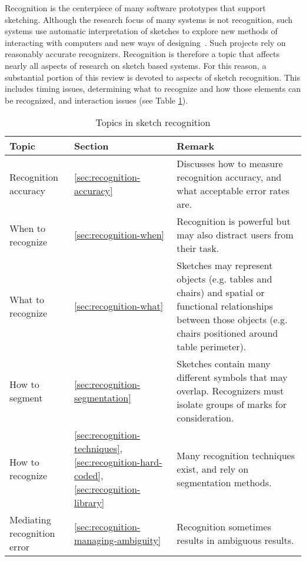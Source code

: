Recognition is the centerpiece of many software prototypes that
support sketching. Although the research focus of many systems is not
recognition, such systems use automatic interpretation of sketches to
explore new methods of interacting with computers and new ways of
designing~\cite{gross-boe,grundy-maramasketch,lin-denim}. Such
projects rely on reasonably accurate recognizers. Recognition is
therefore a topic that affects nearly all aspects of research on
sketch based systems. For this reason, a substantial portion of this
review is devoted to aspects of sketch recognition. This includes
timing issues, determining what to recognize and how those elements
can be recognized, and interaction issues (see
Table \ref{tab:recognition-topics}).

\begin{table}
\begin{tabular}{p{5cm}| p{2cm} | p{8.5cm}}
\textbf{Topic} & \textbf{Section} & \textbf{Remark} \\
\hline \hline
Recognition accuracy &
\ref{sec:recognition-accuracy} & Discusses how to measure recognition 
accuracy, and what acceptable error rates are.
\\ \hline
When to recognize & 
\ref{sec:recognition-when} &
Recognition is powerful but may also distract users from their
task. 
\\ \hline
What to recognize &
\ref{sec:recognition-what} & Sketches may represent objects
(e.g. tables and chairs) and spatial or functional relationships
between those objects (e.g. chairs positioned around table perimeter).
\\ \hline
How to segment &
\ref{sec:recognition-segmentation} &
Sketches contain many different symbols that may overlap. Recognizers
must isolate groups of marks for consideration.
\\ \hline
How to recognize &

\ref{sec:recognition-techniques}, \ref{sec:recognition-hard-coded},
\ref{sec:recognition-library} &

Many recognition techniques exist, and rely on segmentation
methods. \\ \hline

Mediating recognition error &
\ref{sec:recognition-managing-ambiguity} &
Recognition sometimes results in ambiguous results.
\\ \hline

\end{tabular}
\caption{Topics in sketch recognition}
\label{tab:recognition-topics}
\end{table}

